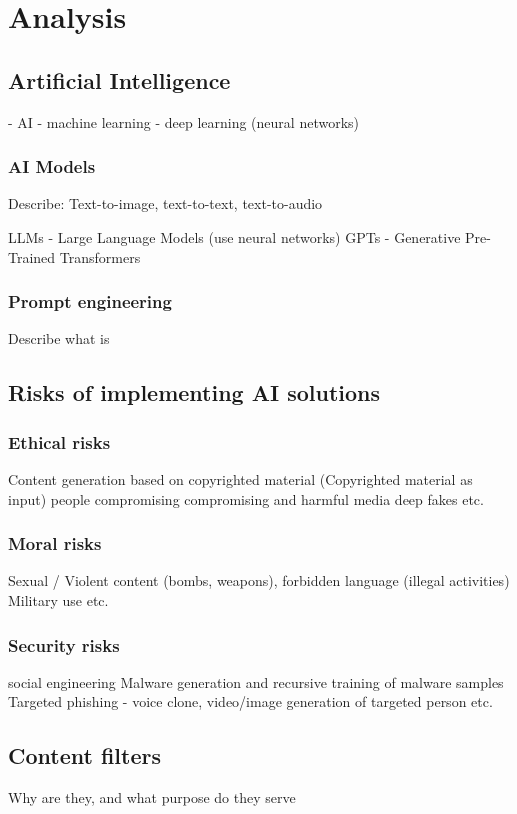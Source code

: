 \chapter{Analysis}

\section{Artificial Intelligence} %
- AI
- machine learning
- deep learning (neural networks)

\subsection{AI Models}
Describe:
Text-to-image, text-to-text, text-to-audio

LLMs - Large Language Models (use neural networks)
GPTs - Generative Pre-Trained Transformers

\subsection{Prompt engineering}
Describe what is

\section{Risks of implementing AI solutions}

\subsection{Ethical risks}
Content generation based on copyrighted material (Copyrighted material as input)
people compromising 
compromising and harmful media 
deep fakes
etc.

\subsection{Moral risks}
Sexual / Violent content (bombs, weapons), forbidden language (illegal activities)
Military use
etc.

\subsection{Security risks}
social engineering
Malware generation and recursive training of malware samples
Targeted phishing - voice clone, video/image generation of targeted person
etc.

\section{Content filters}
Why are they, and what purpose do they serve

